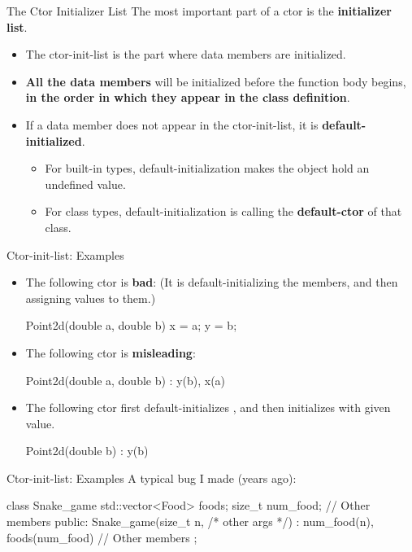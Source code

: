 \documentclass{beamer}
\begin{document}
\begin{frame}{The Ctor Initializer List}
    The most important part of a ctor is the \textbf{initializer list}.
    \begin{itemize}
        \item The ctor-init-list is the part where data members are initialized.
        \item \textbf{All the data members} will be initialized before the function body begins, \textbf{in the order in which they appear in the class definition}.
        \item If a data member does not appear in the ctor-init-list, it is \textbf{default-initialized}.
        \begin{itemize}
            \item For built-in types, default-initialization makes the object hold an undefined value.
            \item For class types, default-initialization is calling the \textbf{default-ctor} of that class.
        \end{itemize}
    \end{itemize}
\end{frame}

\begin{frame}[fragile]{Ctor-init-list: Examples}
    \begin{itemize}
        \item The following ctor is \textbf{bad}: (It is default-initializing the members, and then assigning values to them.)
        \begin{cpp}
Point2d(double a, double b) {
  x = a;
  y = b;
}
        \end{cpp}
        \item The following ctor is \textbf{misleading}:
        \begin{cpp}
Point2d(double a, double b) : y(b), x(a) {}
        \end{cpp}
        \item The following ctor first default-initializes , and then initializes  with given value.
        \begin{cpp}
Point2d(double b) : y(b) {}
        \end{cpp}
    \end{itemize}
\end{frame}

\begin{frame}[fragile]{Ctor-init-list: Examples}
    A typical bug I made (years ago):
    \begin{cpp}
class Snake_game {
  std::vector<Food> foods;
  size_t num_food;
  // Other members
 public:
  Snake_game(size_t n, /* other args */)
    : num_food(n), foods(num_food) {}
  // Other members
};
    \end{cpp}
\end{frame}
\end{document}
